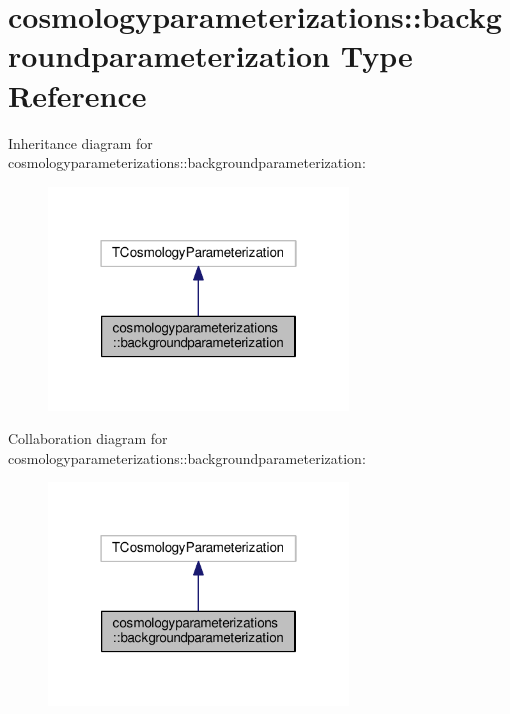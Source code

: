 \hypertarget{structcosmologyparameterizations_1_1backgroundparameterization}{}\section{cosmologyparameterizations\+:\+:backgroundparameterization Type Reference}
\label{structcosmologyparameterizations_1_1backgroundparameterization}


Inheritance diagram for cosmologyparameterizations\+:\+:backgroundparameterization\+:
\nopagebreak
\begin{figure}[H]
\begin{center}
\leavevmode
\includegraphics[width=226pt]{structcosmologyparameterizations_1_1backgroundparameterization__inherit__graph}
\end{center}
\end{figure}


Collaboration diagram for cosmologyparameterizations\+:\+:backgroundparameterization\+:
\nopagebreak
\begin{figure}[H]
\begin{center}
\leavevmode
\includegraphics[width=226pt]{structcosmologyparameterizations_1_1backgroundparameterization__coll__graph}
\end{center}
\end{figure}
